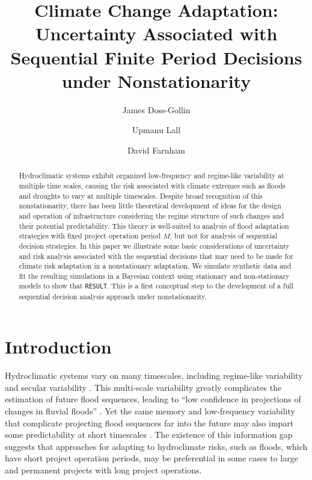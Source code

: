 \documentclass[11pt]{article}
\title{Climate Change Adaptation: Uncertainty Associated with Sequential Finite Period Decisions under Nonstationarity}
\author[1,2]{James Doss-Gollin}
\author[1,2]{Upmanu Lall}
\author[1,2]{David Farnham}
\affil[1]{Columbia Water Center, Columbia University}
\affil[2]{Department of Earth and Environmental Engineering, Columbia University}
\begin{document}
\maketitle
\RaggedRight{}
\begin{abstract}
  Hydroclimatic systems exhibit organized low-frequency and regime-like variability at multiple time scales, causing the risk associated with climate extremes such as floods and droughts to vary at multiple timescales.
  Despite broad recognition of this nonstationarity, there has been little theoretical development of ideas for the design and operation of infrastructure considering the regime structure of such changes and their potential predictability.
  This theory is well-suited to analysis of flood adaptation strategies with fixed project operation period \(M\), but not for analysis of sequential decision strategies.
  In this paper we illustrate some basic considerations of uncertainty and risk analysis associated with the sequential decisions that may need to be made for climate risk adaptation in a nonstationary adaptation.
  We simulate synthetic data and fit the resulting simulations in a Bayesian context using stationary and non-stationary models to show that \texttt{RESULT}.
  This is a first conceptual step to the development of a full sequential decision analysis approach under nonstationarity.
\end{abstract}


\section{Introduction}

Hydroclimatic systems vary on many timescales, including regime-like variability and secular variability  \citep{Milly2008,Merz2014,Hurst1951,Sveinsson2005,Hodgkins2017,Matalas2012}.
This multi-scale variability greatly complicates the estimation of future flood sequences, leading to ``low confidence in projections of changes in fluvial floods'' \citep{IPCC2012}.
Yet the same memory and low-frequency variability that complicate projecting flood sequences far into the future may also impart some predictability at short timescales \citep{Jain2001}.
The existence of this information gap suggests that approaches for adapting to hydroclimate risks, such as floods, which have short project operation periods, may be preferential in some cases to large and permanent projects with long project operations.
\end{document}
